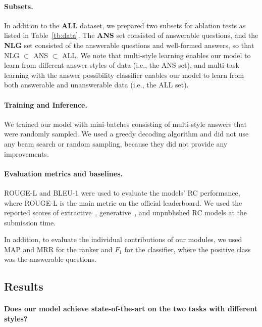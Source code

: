\documentclass[11pt,a4paper]{article}
\theoremstyle{mydef}
\theoremstyle{myprob}
\begin{document}
\paragraph{Subsets.} In addition to the \textbf{ALL} dataset, we prepared two subsets for ablation tests as listed in Table~\ref{tb:data}. The \textbf{ANS} set consisted of answerable questions, and the \textbf{NLG} set consisted of the answerable questions and well-formed answers, so that NLG $\subset$ ANS $\subset$ ALL.
We note that multi-style learning enables our model to learn from different answer styles of data (i.e., the ANS set), and  multi-task learning with the answer possibility classifier enables our model to learn from both answerable and unanswerable data (i.e., the ALL set).

\paragraph{Training and Inference.}
We trained our model with mini-batches consisting of multi-style answers that were randomly sampled. 
We used a greedy decoding algorithm and did not use any beam search or random sampling, because they did not provide any improvements.

\paragraph{Evaluation metrics and baselines.}
ROUGE-L %
and BLEU-1 %
were
used to evaluate the models' RC performance, where ROUGE-L is the main metric on the official leaderboard.
We used the reported scores of extractive~\citep{SeoKFH17,YanAAAI19,WuWLHWLLL18},  generative~\citep{TanWYDLZ18}, and unpublished RC models at the submission time.

In addition, to evaluate 
the individual contributions of our modules,
we used MAP and MRR
for the ranker and $F_1$ for the classifier, where the positive class was the answerable questions.


\subsection{Results} 

\paragraph{Does our model achieve state-of-the-art on the two tasks with different styles?}
\end{document}
